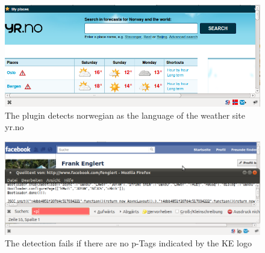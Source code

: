 \begin{frame}[c]
\begin{figure}[htp]
\begin{center}
  \includegraphics[scale=0.4]{../task05/yr_homepage.png} 
  \caption{The plugin detects norwegian as the language of the weather
  site yr.no}
  \label{figureLabel}
\end{center}
\end{figure}
	
\end{frame}

\begin{frame}[c]
\begin{figure}[htp]
\begin{center}
  \includegraphics[scale=0.35]{../task05/facebook_homepage.png} 
  \caption{The detection fails if there are no p-Tags indicated by the KE logo}
  \label{figureLabel}
\end{center}
\end{figure}
	
\end{frame}



